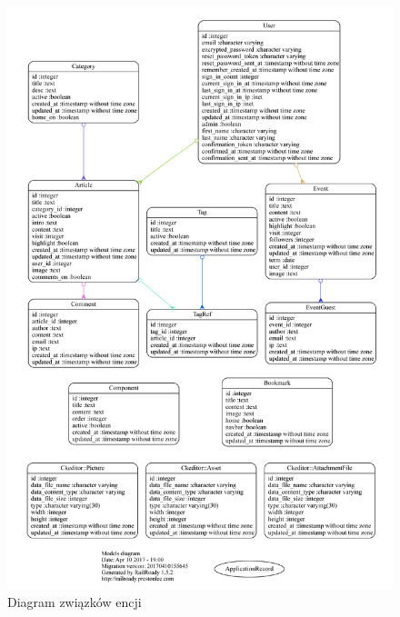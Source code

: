\documentclass[openright]{xmgr}
\begin{document}
\begin{figure}[!tbh]
\centering
\includegraphics[width=.8\linewidth]{fig/erd2}
\caption{Diagram związków encji\label{RYS.1}}
\end{figure}
\end{document}
